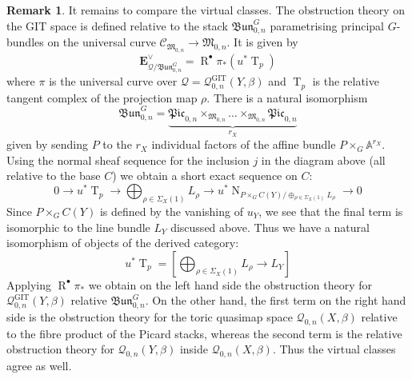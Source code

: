 \documentclass[10pt]{amsart}
\newcommand{\TT}{\operatorname{T}}
\renewcommand{\to}{\rightarrow}
\newcommand{\EE}{\mathbf{E}}
\newcommand{\MM}{\mathfrak M}
\newcommand{\R}{\operatorname{R}^{\bullet}}
\newcommand{\om}[1]{\mathcal{#1}}
\newcommand{\NN}{\operatorname{N}}
\theoremstyle{definition}
\theoremstyle{definition}
\newtheorem{remark}[thm]{Remark}
\begin{document}
\begin{remark}
It remains to compare the virtual classes. The obstruction theory on the GIT space is defined relative to the stack $\mathfrak{Bun}^{G}_{0,n}$ parametrising principal $G$-bundles on the universal curve
$\mathcal{C}_{\MM_{0,n}} \to \MM_{0,n}$.
It is given by
\begin{equation*} \EE_{\om{Q}/\mathfrak{Bun}^G_{0,n}}^\vee = \R \pi_* (u^*\TT_p) \end{equation*}
where $\pi$ is the universal curve over $\om{Q} = \om{Q}^{\operatorname{GIT}}_{0,n}(Y,\beta)$ and $\TT_p$ is the relative tangent complex of the projection map $\rho$. There is a natural isomorphism
\begin{equation*} \mathfrak{Bun}^{G}_{0,n} = \underbrace{\mathfrak{Pic}_{0,n} \times_{\MM_{0,n}} \ldots \times_{\MM_{0,n}} \mathfrak{Pic}_{0,n}}_{r_X} \end{equation*}
given by sending $P$ to the $r_X$ individual factors of the affine bundle $P\times_{G}\mathbb A^{r_X}$. 
Using the normal sheaf sequence for the inclusion $j$ in the diagram above (all relative to the base $C$) we obtain a short exact sequence on $C$:
\begin{equation*} 0 \to u^* \TT_p \to \bigoplus_{\rho \in \Sigma_X(1)} L_\rho \to u^* \NN_{P \times_G C(Y)/\oplus_{\rho \in \Sigma_X(1)} L_\rho} \to 0 \end{equation*}
Since $P \times_G C(Y)$ is defined by the vanishing of $u_Y$, we see that the final term is isomorphic to the line bundle $L_Y$ discussed above. Thus we have a natural isomorphism of objects of the derived category:
\begin{equation*} u^* \TT_p = \left[ \bigoplus_{\rho \in \Sigma_X(1)} L_\rho \to L_Y \right] \end{equation*}
Applying $\R \pi_*$ we obtain on the left hand side the obstruction theory for $\om{Q}^{\operatorname{GIT}}_{0,n}(Y,\beta)$ relative $\mathfrak{Bun}^G_{0,n}$. On the other hand, the first term on the right hand side is the obstruction theory for the toric quasimap space $\om{Q}_{0,n}(X,\beta)$ relative to the fibre product of the Picard stacks, %
whereas the second term is the relative obstruction theory for $\om{Q}_{0,n}(Y,\beta)$ inside $\om{Q}_{0,n}(X,\beta)$. Thus the virtual classes agree as well.

\end{remark}
\end{document}
